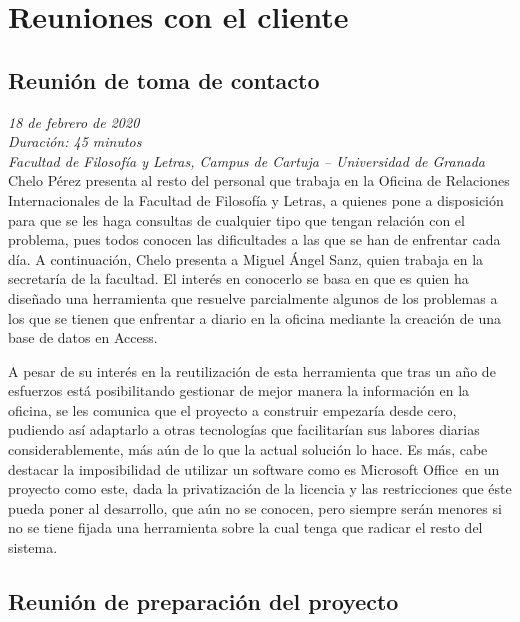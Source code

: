 \appendix
\chapter{Reuniones con el cliente}
	\section{Reunión de toma de contacto}
	\label{reunion1}
		\textit{18 de febrero de 2020}\\
		
		\textit{Duración: 45 minutos}\\

		\textit{Facultad de Filosofía y Letras, Campus de Cartuja -- Universidad de Granada}\\
		
		Chelo Pérez presenta al resto del personal que trabaja en la Oficina de Relaciones Internacionales de la Facultad de Filosofía y Letras, a quienes pone a disposición para que se les haga consultas de cualquier tipo que tengan relación con el problema, pues todos conocen las dificultades a las que se han de enfrentar cada día. A continuación, Chelo presenta a Miguel Ángel Sanz, quien trabaja en la secretaría de la facultad. El interés en conocerlo se basa en que es quien ha diseñado una herramienta que resuelve parcialmente algunos de los problemas a los que se tienen que enfrentar a diario en la oficina mediante la creación de una base de datos en Access\textregistered.
		
		A pesar de su interés en la reutilización de esta herramienta que tras un año de esfuerzos está posibilitando gestionar de mejor manera la información en la oficina, se les comunica que el proyecto a construir empezaría desde cero, pudiendo así adaptarlo a otras tecnologías que facilitarían sus labores diarias considerablemente, más aún de lo que la actual solución lo hace. Es más, cabe destacar la imposibilidad de utilizar un software como es Microsoft Office\textregistered \ en un proyecto como este, dada la privatización de la licencia y las restricciones que éste pueda poner al desarrollo, que aún no se conocen, pero siempre serán menores si no se tiene fijada una herramienta sobre la cual tenga que radicar el resto del sistema.
		
	\section{Reunión de preparación del proyecto}
	\label{reunion2}
	
